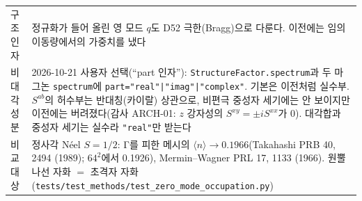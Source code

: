 \begin{tabularx}{\textwidth}{@{}P{3.0cm}Y@{}}
    구조인자 & 정규화가 들어 올린 영 모드 $q$도 D52 극한(Bragg)으로 다룬다. 이전에는 임의 이동량에서의 가중치를 냈다 \\
    비대각 성분 & 2026-10-21 사용자 선택(``part 인자''): \texttt{StructureFactor.spectrum}과 두 마그논 \texttt{spectrum}에 \texttt{part="real"|"imag"|"complex"}. 기본은 이전처럼 실수부. $S^{ab}$의 허수부는 반대칭(카이랄) 상관으로, 비편극 중성자 세기에는 안 보이지만 이전에는 버려졌다(감사 ARCH-01: $z$ 강자성의 $S^{xy}=\pm iS^{xx}$가 0). 대각합과 중성자 세기는 실수라 \texttt{"real"}만 받는다 \\
    비교 대상 & 정사각 Néel $S=1/2$: Γ를 피한 메시의 $\langle n\rangle\to0.1966$(Takahashi PRB 40, 2494 (1989); $64^2$에서 0.1926), Mermin--Wagner PRL 17, 1133 (1966). 원뿔 나선 자화 $=$ 초격자 자화(\texttt{tests/test\_methods/test\_zero\_mode\_occupation.py}) \\
    \bottomrule
  \end{tabularx}
\endgroup

